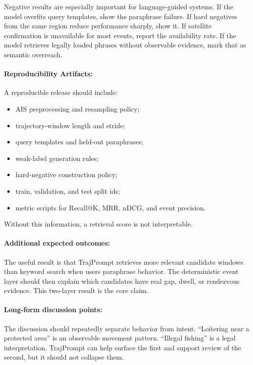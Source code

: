 \documentclass{article}
\begin{document}
Negative results are especially important for language-guided systems. If the model overfits query templates, show the paraphrase failure. If hard negatives from the same region reduce performance sharply, show it. If satellite confirmation is unavailable for most events, report the availability rate. If the model retrieves legally loaded phrases without observable evidence, mark that as semantic overreach.

\paragraph{Reproducibility Artifacts:}

A reproducible release should include:
\begin{itemize}
  \item AIS preprocessing and resampling policy;
  \item trajectory-window length and stride;
  \item query templates and held-out paraphrases;
  \item weak-label generation rules;
  \item hard-negative construction policy;
  \item train, validation, and test split ids;
  \item metric scripts for Recall@K, MRR, nDCG, and event precision.
\end{itemize}
Without this information, a retrieval score is not interpretable.

\paragraph{Additional expected outcomes:}

The useful result is that TrajPrompt retrieves more relevant candidate windows than keyword search when users paraphrase behavior. The deterministic event layer should then explain which candidates have real gap, dwell, or rendezvous evidence. This two-layer result is the core claim.

\paragraph{Long-form discussion points:}

The discussion should repeatedly separate behavior from intent. ``Loitering near a protected area'' is an observable movement pattern. ``Illegal fishing'' is a legal interpretation. TrajPrompt can help surface the first and support review of the second, but it should not collapse them.
\end{document}
